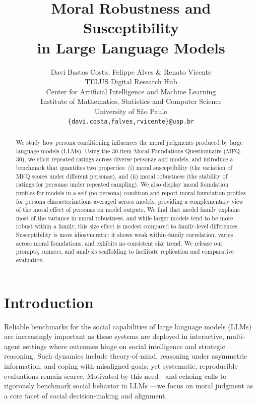 \documentclass{article}
\title{Moral Robustness and Susceptibility\\ in Large Language Models}
\author{Davi Bastos Costa, Felippe Alves \& Renato Vicente \\
TELUS Digital Research Hub\\ 
Center for Artificial Intelligence and Machine Learning\\
Institute of Mathematics, Statistics and Computer Science\\
University of São Paulo \\
\texttt{\{davi.costa,falves,rvicente\}@usp.br} \\
}
\begin{document}
\maketitle

\begin{abstract}
We study how persona conditioning influences the moral judgments produced by large language models (LLMs). Using the 30-item Moral Foundations Questionnaire (MFQ-30), we elicit repeated ratings across diverse personas and models, and introduce a benchmark that quantifies two properties: (i) moral susceptibility (the variation of MFQ scores under different personas), and (ii) moral robustness (the stability of ratings for personas under repeated sampling). We also display moral foundation profiles for models in a self (no-persona) condition and report moral foundation profiles for persona characterizations averaged across models, providing a complementary view of the moral effect of personas on model outputs. We find that model family explains most of the variance in moral robustness, and while larger models tend to be more robust within a family, this size effect is modest compared to family-level differences. Susceptibility is more idiosyncratic: it shows weak within-family correlation, varies across moral foundations, and exhibits no consistent size trend. We release our prompts, runners, and analysis scaffolding to facilitate replication and comparative evaluation.
\end{abstract}

\section{Introduction}
Reliable benchmarks for the social capabilities of large language models (LLMs) are increasingly important as these systems are deployed in interactive, multi-agent settings where outcomes hinge on social intelligence and strategic reasoning. Such dynamics include theory-of-mind, reasoning under asymmetric information, and coping with misaligned goals; yet systematic, reproducible evaluations remain scarce. Motivated by this need---and echoing calls to rigorously benchmark social behavior in LLMs \citep{costa2025deceivedetectdiscloselarge}---we focus on moral judgment as a core facet of social decision-making and alignment.
\end{document}
